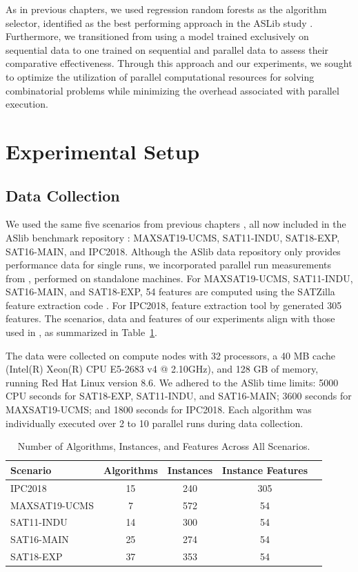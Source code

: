 As in previous chapters, we used regression random forests as the algorithm selector, identified as the best performing approach in the ASLib study \cite{BISCHL201641}. Furthermore, we transitioned from using a model trained exclusively on sequential data to one trained on sequential and parallel data to assess their comparative effectiveness. Through this approach and our experiments, we sought to optimize the utilization of parallel computational resources for solving combinatorial problems while minimizing the overhead associated with parallel execution.


\section{Experimental Setup}
\subsection{Data Collection}
We used the same five scenarios from previous chapters \cite{kashgarani2023automatic}, all now included in the ASlib benchmark repository \cite{BISCHL201641}: MAXSAT19-UCMS, SAT11-INDU, SAT18-EXP, SAT16-MAIN, and IPC2018. Although the ASlib data repository only provides performance data for single runs, we incorporated parallel run measurements from \cite{kashgarani2023automatic}, performed on standalone machines. For MAXSAT19-UCMS, SAT11-INDU, SAT16-MAIN, and SAT18-EXP, 54 features are computed using the SATZilla feature extraction code \cite{satzilla}. For IPC2018, feature extraction tool by \cite{Fawcett_Vallati_Hutter_Hoffmann_Hoos_Leyton-Brown_2014} generated 305 features. The scenarios, data and features of our experiments align with those used in \cite{kashgarani2023automatic}, as summarized in Table~\ref{tab:scenarios6}.

The data were collected on compute nodes with 32 processors, a 40 MB cache (Intel(R) Xeon(R) CPU E5-2683 v4 @ 2.10GHz), and 128 GB of memory, running Red Hat Linux version 8.6. We adhered to the ASlib time limits: 5000 CPU seconds for SAT18-EXP, SAT11-INDU, and SAT16-MAIN; 3600 seconds for MAXSAT19-UCMS; and 1800 seconds for IPC2018. Each algorithm was individually executed over 2 to 10 parallel runs during data collection.

\begin{table}
\centering
\caption{Number of Algorithms, Instances, and Features Across All Scenarios.}
\label{tab:scenarios6}
\begin{tabular}{p{5cm} cccc}
\toprule
Scenario & Algorithms & Instances & Instance Features\\
\midrule
IPC2018 & 15 & 240 & 305\\
MAXSAT19-UCMS & 7 & 572 & 54\\
SAT11-INDU & 14 & 300 & 54\\
SAT16-MAIN & 25 & 274 & 54\\
SAT18-EXP & 37 & 353 & 54\\
\bottomrule
\end{tabular}
\end{table}

